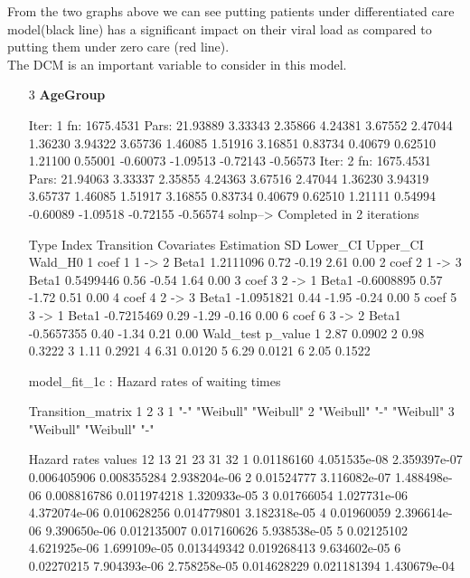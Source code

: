 \documentclass[11pt,a4paper]{article}
\begin{document}
From the two graphs above we can see putting patients under differentiated care model(black line) has a significant impact on their viral load as compared to putting them under zero care (red line). \\The DCM is an important variable to consider in this model.
\begin{enumerate}
  \item[3] \textbf{AgeGroup}
\begin{Schunk}
\begin{Soutput}
Iter: 1 fn: 1675.4531	 Pars:  21.93889  3.33343  2.35866  4.24381  3.67552  2.47044  1.36230  3.94322  3.65736  1.46085  1.51916  3.16851  0.83734  0.40679  0.62510  1.21100  0.55001 -0.60073 -1.09513 -0.72143 -0.56573
Iter: 2 fn: 1675.4531	 Pars:  21.94063  3.33337  2.35855  4.24363  3.67516  2.47044  1.36230  3.94319  3.65737  1.46085  1.51917  3.16855  0.83734  0.40679  0.62510  1.21111  0.54994 -0.60089 -1.09518 -0.72155 -0.56574
solnp--> Completed in 2 iterations
\end{Soutput}
\begin{Soutput}
  Type Index Transition Covariates Estimation   SD Lower_CI Upper_CI Wald_H0
1 coef     1     1 -> 2      Beta1  1.2111096 0.72    -0.19     2.61    0.00
2 coef     2     1 -> 3      Beta1  0.5499446 0.56    -0.54     1.64    0.00
3 coef     3     2 -> 1      Beta1 -0.6008895 0.57    -1.72     0.51    0.00
4 coef     4     2 -> 3      Beta1 -1.0951821 0.44    -1.95    -0.24    0.00
5 coef     5     3 -> 1      Beta1 -0.7215469 0.29    -1.29    -0.16    0.00
6 coef     6     3 -> 2      Beta1 -0.5657355 0.40    -1.34     0.21    0.00
  Wald_test p_value
1      2.87  0.0902
2      0.98  0.3222
3      1.11  0.2921
4      6.31  0.0120
5      6.29  0.0121
6      2.05  0.1522
\end{Soutput}
\begin{Soutput}
model_fit_1c  : Hazard rates of waiting times

Transition_matrix
  1         2         3        
1 "-"       "Weibull" "Weibull"
2 "Weibull" "-"       "Weibull"
3 "Weibull" "Weibull" "-"      

Hazard rates values 
          12           13           21          23          31           32
1 0.01186160 4.051535e-08 2.359397e-07 0.006405906 0.008355284 2.938204e-06
2 0.01524777 3.116082e-07 1.488498e-06 0.008816786 0.011974218 1.320933e-05
3 0.01766054 1.027731e-06 4.372074e-06 0.010628256 0.014779801 3.182318e-05
4 0.01960059 2.396614e-06 9.390650e-06 0.012135007 0.017160626 5.938538e-05
5 0.02125102 4.621925e-06 1.699109e-05 0.013449342 0.019268413 9.634602e-05
6 0.02270215 7.904393e-06 2.758258e-05 0.014628229 0.021181394 1.430679e-04


\end{Soutput}
\end{Schunk}
\end{enumerate}
\end{document}
